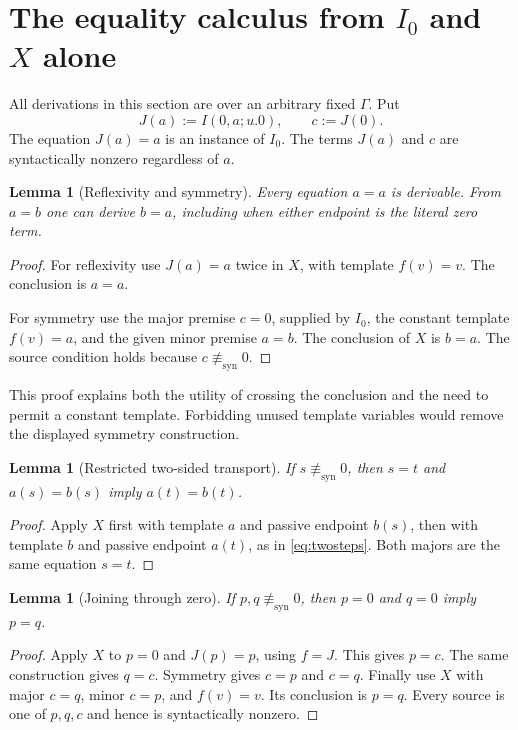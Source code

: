 \documentclass[11pt]{article}
\newtheorem{lemma}[theorem]{Lemma}
\theoremstyle{definition}\newtheorem{definition}[theorem]{Definition}
\theoremstyle{remark}\newtheorem{remark}[theorem]{Remark}
\newcommand{\nolit}{\not\equiv_{\mathrm{syn}}}
\begin{document}
\section{The equality calculus from \texorpdfstring{$I_0$ and $X$}{I0 and X} alone}

All derivations in this section are over an arbitrary fixed $\Gamma$.
Put
\[
       J(a):=I(0,a;u.0),\qquad c:=J(0).
\]
The equation $J(a)=a$ is an instance of $I_0$.
The terms $J(a)$ and $c$ are syntactically nonzero regardless of $a$.

\begin{lemma}[Reflexivity and symmetry]\label{lem:sym}
Every equation $a=a$ is derivable. From $a=b$ one can derive $b=a$,
including when either endpoint is the literal zero term.
\end{lemma}
\begin{proof}
For reflexivity use $J(a)=a$ twice in $X$, with template $f(v)=v$.
The conclusion is $a=a$.

For symmetry use the major premise $c=0$, supplied by $I_0$, the
constant template $f(v)=a$, and the given minor premise $a=b$.
The conclusion of $X$ is $b=a$. The source condition holds because
$c\nolit0$.
\end{proof}

This proof explains both the utility of crossing the conclusion and the
need to permit a constant template. Forbidding unused template variables
would remove the displayed symmetry construction.

\begin{lemma}[Restricted two-sided transport]\label{lem:twox}
If $s\nolit0$, then $s=t$ and $a(s)=b(s)$ imply $a(t)=b(t)$.
\end{lemma}
\begin{proof}
Apply $X$ first with template $a$ and passive endpoint $b(s)$, then
with template $b$ and passive endpoint $a(t)$, as in
\eqref{eq:twosteps}. Both majors are the same equation $s=t$.
\end{proof}

\begin{lemma}[Joining through zero]\label{lem:join}
If $p,q\nolit0$, then $p=0$ and $q=0$ imply $p=q$.
\end{lemma}
\begin{proof}
Apply $X$ to $p=0$ and $J(p)=p$, using $f=J$. This gives $p=c$.
The same construction gives $q=c$. Symmetry gives $c=p$ and $c=q$.
Finally use $X$ with major $c=q$, minor $c=p$, and $f(v)=v$.
Its conclusion is $p=q$. Every source is one of $p,q,c$ and hence
is syntactically nonzero.
\end{proof}
\end{document}

